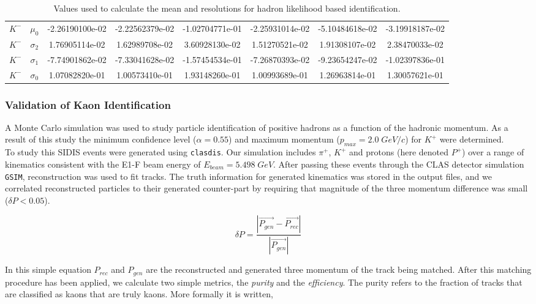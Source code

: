 \begin{landscape}
\begin{table}
\begin{tabular}{c|c|c|c|c|c|c|c}
       $K^-$ & $\mu_0$ & -2.26190100e-02 &    -2.22562379e-02 &     -1.02704771e-01 &    -2.25931014e-02 &    -5.10484618e-02 &    -3.19918187e-02 \\
    $K^-$ & $\sigma_2$ & 1.76905114e-02 &     1.62989708e-02 &     3.60928130e-02 &     1.51270521e-02 &     1.91308107e-02 &     2.38470033e-02 \\
    $K^-$ & $\sigma_1$ & -7.74901862e-02 &    -7.33041628e-02 &    -1.57454534e-01 &    -7.26870393e-02 &     -9.23654247e-02 &    -1.02397836e-01 \\
    $K^-$ & $\sigma_0$ & 1.07082820e-01 &     1.00573410e-01 &     1.93148260e-01 &     1.00993689e-01 &     1.26963814e-01 &     1.30057621e-01
  \end{tabular}
  \caption{Values used to calculate the mean and resolutions for hadron likelihood based identification.}
  \label{table-hadron-pdfs}
  \end{table}
\end{landscape}

%
%

\subsubsection*{Validation of Kaon Identification}
A Monte Carlo simulation was used to study particle identification of positive hadrons as a function of the hadronic momentum.  As a result of this study the minimum confidence level ($\alpha = 0.55$) and maximum momentum ($p_{max} = 2.0 \; GeV/c$) for $K^+$ were determined. \\

To study this SIDIS events were generated using \texttt{clasdis}.  Our simulation includes $\pi^+$, $K^+$ and protons (here denoted $P^+$) over a range of kinematics consistent with the E1-F beam energy of $E_{beam} = 5.498 \; GeV$.  After passing these events through the CLAS detector simulation \texttt{GSIM}, reconstruction was used to fit tracks.  The truth information for generated kinematics was stored in the output files, and we correlated reconstructed particles to their generated counter-part by requiring that magnitude of the three momentum difference was small ($\delta P < 0.05$).  

\begin{equation}
	\delta P = \frac{|\vec{P_{gen}} - \vec{P_{rec}}|}{|\vec{P_{gen}}|}
\end{equation}   

In this simple equation $P_{rec}$ and $P_{gen}$ are the reconstructed and generated three momentum of the track being matched.  After this matching procedure has been applied, we calculate two simple metrics, the \textit{purity} and the \textit{efficiency}.  The purity refers to the fraction of tracks that are classified as kaons that are truly kaons.  More formally it is written, 

